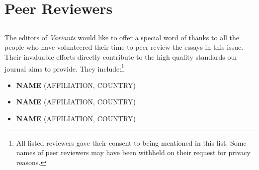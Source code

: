 \pagestyle{authors}
\chapter*{Peer Reviewers}
\protect\thispagestyle{chaptertitlepage}


\section*{}
The editors of \emph{Variants} would like to offer a special word of thanks to all the people who have volunteered their time to peer review the essays in this issue. Their invaluable efforts directly contribute to the high quality standards our journal aims to provide. They include:\footnote{All listed reviewers gave their consent to being mentioned in this list. Some names of peer reviewers may have been withheld on their request for privacy reasons.} 

\begin{itemize}
    \item \textbf{NAME} (AFFILIATION, COUNTRY)
    \item \textbf{NAME} (AFFILIATION, COUNTRY)
    \item \textbf{NAME} (AFFILIATION, COUNTRY)
\end{itemize}

